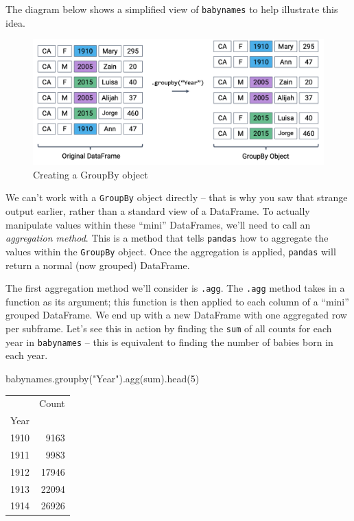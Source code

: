 \documentclass[
  letterpaper,
  DIV=11,
  numbers=noendperiod]{scrreprt}
\newenvironment{Shaded}{\begin{snugshade}}{\end{snugshade}}
\newcommand{\BuiltInTok}[1]{\textcolor[rgb]{0.00,0.23,0.31}{#1}}
\newcommand{\DecValTok}[1]{\textcolor[rgb]{0.68,0.00,0.00}{#1}}
\newcommand{\NormalTok}[1]{\textcolor[rgb]{0.00,0.23,0.31}{#1}}
\newcommand{\StringTok}[1]{\textcolor[rgb]{0.13,0.47,0.30}{#1}}
\begin{document}
The diagram below shows a simplified view of \texttt{babynames} to help
illustrate this idea.

\begin{figure}

{\centering \includegraphics{pandas_2/images/gb.png}

}

\caption{Creating a GroupBy object}

\end{figure}

We can't work with a \texttt{GroupBy} object directly -- that is why you
saw that strange output earlier, rather than a standard view of a
DataFrame. To actually manipulate values within these ``mini''
DataFrames, we'll need to call an \emph{aggregation method}. This is a
method that tells \texttt{pandas} how to aggregate the values within the
\texttt{GroupBy} object. Once the aggregation is applied,
\texttt{pandas} will return a normal (now grouped) DataFrame.

The first aggregation method we'll consider is \texttt{.agg}. The
\texttt{.agg} method takes in a function as its argument; this function
is then applied to each column of a ``mini'' grouped DataFrame. We end
up with a new DataFrame with one aggregated row per subframe. Let's see
this in action by finding the \texttt{sum} of all counts for each year
in \texttt{babynames} -- this is equivalent to finding the number of
babies born in each year.

\begin{Shaded}
\begin{Highlighting}[]
\NormalTok{babynames.groupby(}\StringTok{"Year"}\NormalTok{).agg(}\BuiltInTok{sum}\NormalTok{).head(}\DecValTok{5}\NormalTok{)}
\end{Highlighting}
\end{Shaded}

\begin{tabular}{lr}
\toprule
{} &  Count \\
Year &        \\
\midrule
1910 &   9163 \\
1911 &   9983 \\
1912 &  17946 \\
1913 &  22094 \\
1914 &  26926 \\
\bottomrule
\end{tabular}
\end{document}
